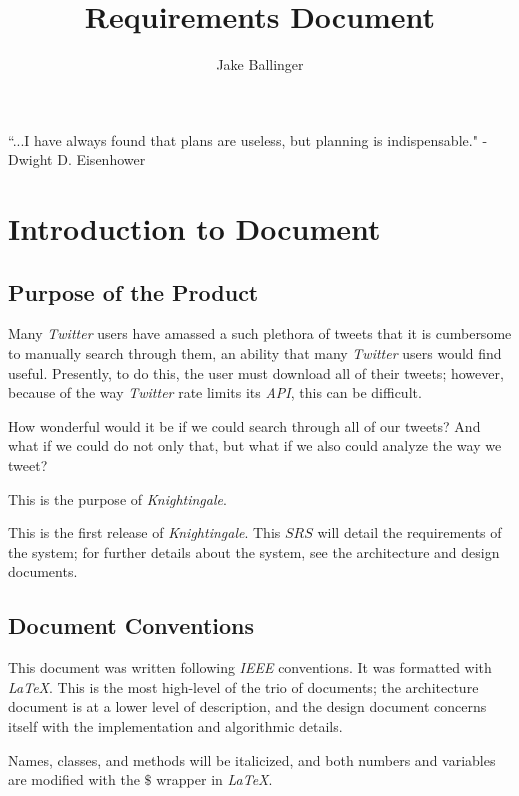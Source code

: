\documentclass[a4paper, 12pt]{article}
\title{Requirements Document}
\author{Jake Ballinger}
\begin{document}
\maketitle

\begin{center}
\centering  ``...I have always found that plans are useless, but planning is indispensable." \newline
\centering - Dwight D. Eisenhower
\end{center}

\section{Introduction to Document} \label{sec:intro}
\subsection{Purpose of the Product} \label{sec:purpose}
\begin{adjustwidth}{2em}{0pt}
Many \textit{Twitter} users have amassed a such plethora of tweets that it is cumbersome to manually search through them, an ability that many \textit{Twitter} users would find useful. Presently, to do this, the user must download all of their tweets; however, because of the way \textit{Twitter} rate limits its \textit{API}, this can be difficult. \newline

\noindent How wonderful would it be if we could search through all of our tweets? And what if we could do not only that, but what if we also could analyze the way we tweet?\newline

\noindent This is the purpose of \textit{Knightingale}. \newline

\noindent This is the first release of \textit{Knightingale}. This $SRS$ will detail the requirements of the system; for further details about the system, see the architecture and design documents.
\end{adjustwidth}

\subsection{Document Conventions} \label{sec:conventions}
\begin{adjustwidth}{2em}{0pt}
This document was written following \textit{IEEE} conventions. It was formatted with \textit{LaTeX}. This is the most high-level of the trio of documents; the architecture document is at a lower level of description, and the design document concerns itself with the implementation and algorithmic details. \newline

\noindent Names, classes, and methods will be italicized, and both numbers and variables are modified with the $\$$ wrapper in \textit{LaTeX}.
\end{adjustwidth}
\end{document}
